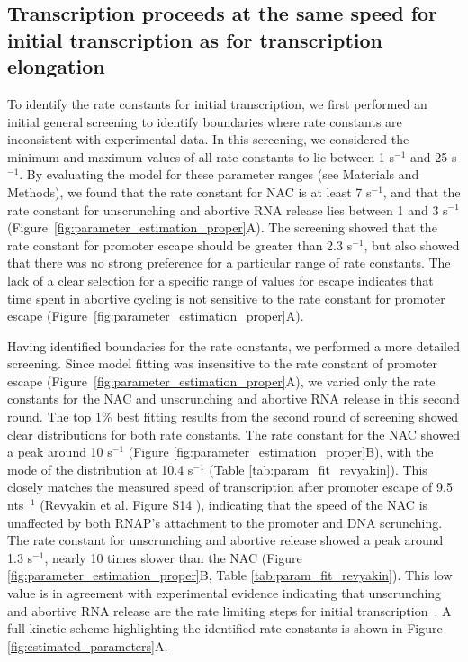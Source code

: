 %
\subsection{Transcription proceeds at the same speed for initial transcription
as for transcription elongation}

To identify the rate constants for initial transcription, we first performed
an initial general screening to identify boundaries where rate constants
are inconsistent with experimental data. In this screening, we
considered the minimum and maximum values of all rate constants to lie between
1 s$^{-1}$ and 25 s$^{-1}$. By evaluating the model for these parameter ranges
(see Materials and Methods), we found that the rate constant for NAC is at
least 7 s$^{-1}$, and that the rate constant for unscrunching and abortive RNA
release lies between 1 and 3 s$^{-1}$
(Figure~\ref{fig:parameter_estimation_proper}A). The screening showed that the
rate constant for promoter escape should be greater than 2.3 s$^{-1}$, but
also showed that there was no strong preference for a particular range of rate
constants. The lack of a clear selection for a specific range of values for
escape indicates that time spent in abortive cycling is not sensitive to the
rate constant for promoter escape
(Figure~\ref{fig:parameter_estimation_proper}A).

Having identified boundaries for the rate constants, we performed a more
detailed screening. Since model fitting was insensitive to the rate
constant of promoter escape (Figure~\ref{fig:parameter_estimation_proper}A),
we varied only the rate constants for the NAC and unscrunching and abortive
RNA release in this second round. The top 1\% best fitting results from the
second round of screening showed clear distributions for both rate constants.
The rate constant for the NAC showed a peak around 10 s$^{-1}$ (Figure
\ref{fig:parameter_estimation_proper}B), with the mode of the distribution at
10.4 s$^{-1}$ (Table \ref{tab:param_fit_revyakin}). This closely matches the
measured speed of transcription after promoter escape of 9.5 nts$^{-1}$
(Revyakin et al. Figure S14 \cite{revyakin_abortive_2006}), indicating that
the speed of the NAC is unaffected by both RNAP's attachment to the promoter
and DNA scrunching. The rate constant for unscrunching and abortive release
showed a peak around 1.3 s$^{-1}$, nearly 10 times slower than the NAC (Figure
\ref{fig:parameter_estimation_proper}B, Table \ref{tab:param_fit_revyakin}).
This low value is in agreement with experimental evidence indicating that
unscrunching and abortive RNA release are the rate limiting steps for initial
transcription~\cite{revyakin_abortive_2006, margeat_direct_2006}. A full
kinetic scheme highlighting the identified rate constants is shown in Figure
\ref{fig:estimated_parameters}A.

